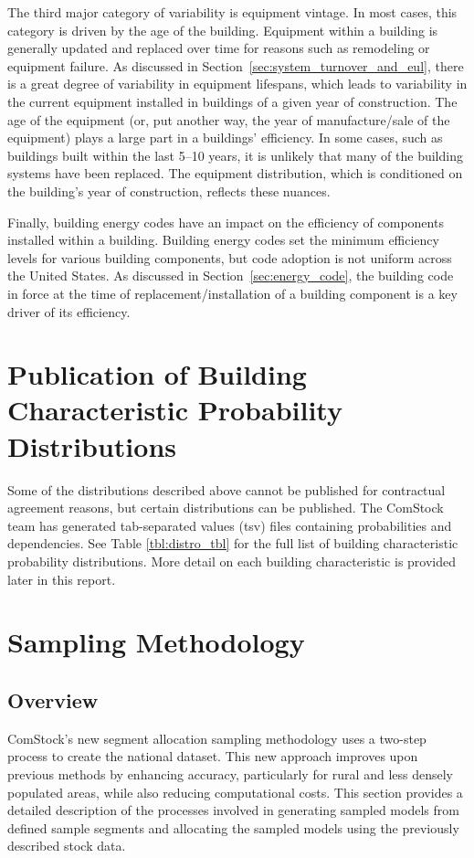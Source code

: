 The third major category of variability is equipment vintage. In most cases, this category is driven by the age of the building. Equipment within a building is generally updated and replaced over time for reasons such as remodeling or equipment failure. As discussed in Section~\ref{sec:system_turnover_and_eul}, there is a great degree of variability in equipment lifespans, which leads to variability in the current equipment installed in buildings of a given year of construction. The age of the equipment (or, put another way, the year of manufacture/sale of the equipment) plays a large part in a buildings' efficiency. In some cases, such as buildings built within the last 5--10 years, it is unlikely that many of the building systems have been replaced. The equipment distribution, which is conditioned on the building's year of construction, reflects these nuances.

Finally, building energy codes have an impact on the efficiency of components installed within a building. Building energy codes set the minimum efficiency levels for various building components, but code adoption is not uniform across the United States. As discussed in Section~\ref{sec:energy_code}, the building code in force at the time of replacement/installation of a building component is a key driver of its efficiency.

\section{Publication of Building Characteristic Probability Distributions}
Some of the distributions described above cannot be published for contractual agreement reasons, but certain distributions can be published. The ComStock team has generated tab-separated values (tsv) files containing probabilities and dependencies. See Table \ref{tbl:distro_tbl} for the full list of building characteristic probability distributions. More detail on each building characteristic is provided later in this report.



\section{Sampling Methodology}
\subsection{Overview}
ComStock's new segment allocation sampling methodology uses a two-step process to create the national dataset. This new approach improves upon previous methods by enhancing accuracy, particularly for rural and less densely populated areas, while also reducing computational costs. This section provides a detailed description of the processes involved in generating sampled models from defined sample segments and allocating the sampled models using the previously described stock data.


